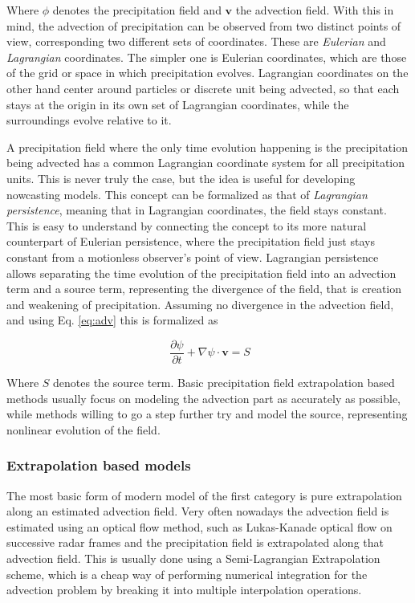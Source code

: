 Where $\phi$ denotes the precipitation field and $\pmb{v}$ the advection field. With this in mind, the advection of precipitation can be observed from two distinct points of view, corresponding two different sets of coordinates. These are \textit{Eulerian} and \textit{Lagrangian} coordinates. The simpler one is Eulerian coordinates, which are those of the grid or space in which precipitation evolves. Lagrangian coordinates on the other hand center around particles or discrete unit being advected, so that each stays at the origin in its own set of Lagrangian coordinates, while the surroundings evolve relative to it. 

A precipitation field where the only time evolution happening is the precipitation being advected has a common Lagrangian coordinate system for all precipitation units. This is never truly the case, but the idea is useful for developing nowcasting models. This concept can be formalized as that of \textit{Lagrangian persistence}, meaning that in Lagrangian coordinates, the field stays constant. This is easy to understand by connecting the concept to its more natural counterpart of Eulerian persistence, where the precipitation field just stays constant from a motionless observer's point of view. Lagrangian persistence allows separating the time evolution of the precipitation field into an advection term and a source term, representing the divergence of the field, that is creation and weakening of precipitation. Assuming no divergence in the advection field, and using Eq. \ref{eq:adv} this is formalized as 

\begin{equation}
\
\frac{\partial \psi}{\partial t} + \nabla \psi \cdot \pmb{v} = S 
\end{equation}

Where $S$ denotes the source term. Basic precipitation field extrapolation based methods usually focus on modeling the advection part as accurately as possible, while methods willing to go a step further try and model the source, representing nonlinear evolution of the field. 

\subsubsection*{Extrapolation based models}

The most basic form of modern model of the first category is pure extrapolation along an estimated advection field. Very often nowadays the advection field is estimated using an optical flow method, such as Lukas-Kanade optical flow \cite{lucas1981iterative} on successive radar frames and the precipitation field is extrapolated along that advection field. This is usually done using a Semi-Lagrangian Extrapolation scheme, which is a cheap way of performing numerical integration for the advection problem by breaking it into multiple interpolation operations. 

